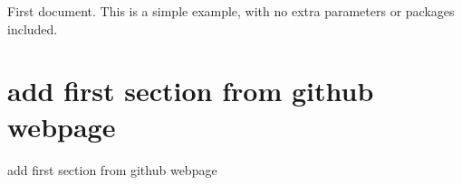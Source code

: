\documentclass{article}
\begin{document}
First document. This is a simple example, with no 
extra parameters or packages included.

\section{add first section from github webpage}
add first section from github webpage
\end{document}
